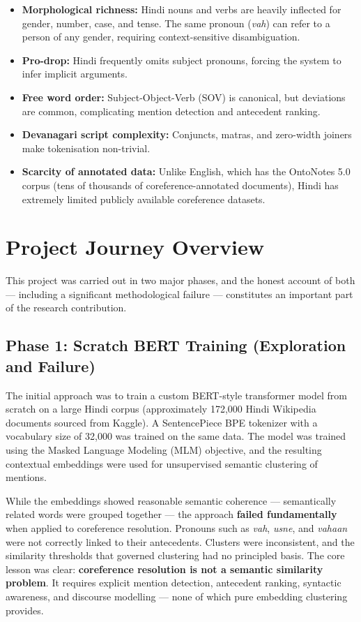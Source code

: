 \documentclass[12pt,a4paper]{report}
\begin{document}
\begin{itemize}
    \item \textbf{Morphological richness:} Hindi nouns and verbs are heavily inflected for gender, number, case, and tense. The same pronoun (\textit{vah}) can refer to a person of any gender, requiring context-sensitive disambiguation.
    \item \textbf{Pro-drop:} Hindi frequently omits subject pronouns, forcing the system to infer implicit arguments.
    \item \textbf{Free word order:} Subject-Object-Verb (SOV) is canonical, but deviations are common, complicating mention detection and antecedent ranking.
    \item \textbf{Devanagari script complexity:} Conjuncts, matras, and zero-width joiners make tokenisation non-trivial.
    \item \textbf{Scarcity of annotated data:} Unlike English, which has the OntoNotes 5.0 corpus (tens of thousands of coreference-annotated documents), Hindi has extremely limited publicly available coreference datasets.
\end{itemize}

\section{Project Journey Overview}

This project was carried out in two major phases, and the honest account of both --- including a significant methodological failure --- constitutes an important part of the research contribution.

\subsection{Phase 1: Scratch BERT Training (Exploration and Failure)}

The initial approach was to train a custom BERT-style transformer model from scratch on a large Hindi corpus (approximately 172,000 Hindi Wikipedia documents sourced from Kaggle). A SentencePiece BPE tokenizer with a vocabulary size of 32,000 was trained on the same data. The model was trained using the Masked Language Modeling (MLM) objective, and the resulting contextual embeddings were used for unsupervised semantic clustering of mentions.

While the embeddings showed reasonable semantic coherence --- semantically related words were grouped together --- the approach \textbf{failed fundamentally} when applied to coreference resolution. Pronouns such as \textit{vah}, \textit{usne}, and \textit{vahaan} were not correctly linked to their antecedents. Clusters were inconsistent, and the similarity thresholds that governed clustering had no principled basis. The core lesson was clear: \textbf{coreference resolution is not a semantic similarity problem}. It requires explicit mention detection, antecedent ranking, syntactic awareness, and discourse modelling --- none of which pure embedding clustering provides.
\end{document}

